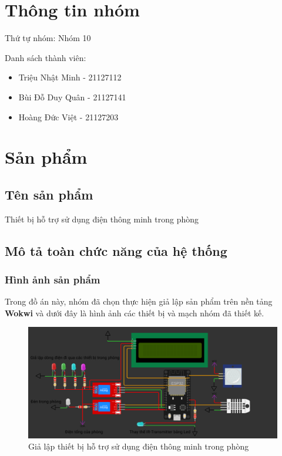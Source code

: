 \documentclass{report}
\begin{document}
\section{Thông tin nhóm}
Thứ tự nhóm: Nhóm 10 \par
Danh sách thành viên:
\begin{itemize}
    \item Triệu Nhật Minh - 21127112
    \item Bùi Đỗ Duy Quân - 21127141
    \item Hoàng Đức Việt - 21127203
\end{itemize}

\section{Sản phẩm}
\subsection{Tên sản phẩm}
Thiết bị hỗ trợ sử dụng điện thông minh trong phòng

\subsection{Mô tả toàn chức năng của hệ thống}
\subsubsection{Hình ảnh sản phẩm}
Trong đồ án này, nhóm đã chọn thực hiện giả lập sản phẩm trên nền tảng \textbf{Wokwi} và dưới đây là hình ảnh các thiết bị và mạch nhóm đã thiết kế.
\begin{figure}[!h]
    \centering
    \includegraphics[width=\textwidth, keepaspectratio]{img/thiet_bi.png}
    \caption{Giả lập thiết bị hỗ trợ sử dụng điện thông minh trong phòng}
\end{figure}
\end{document}
